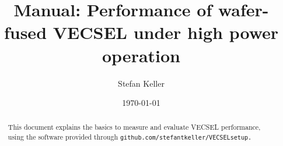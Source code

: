 \documentclass[11pt, a4paper, twoside]{article}
\title{Manual: Performance of wafer-fused VECSEL under high power operation}
\author{Stefan Keller}
\date{\today}
\newcommand{\code}[1]{\texttt{#1}}
\numberwithin{equation}{section} %
\numberwithin{table}{section}
\numberwithin{figure}{section}
\begin{document}
\maketitle
{}
\fancyhead[LO]{\leftmark}

\begin{abstract}
This document explains the basics
to measure and evaluate
VECSEL performance,
using the software provided
through \code{github.com/stefantkeller/VECSELsetup.}
\end{abstract}

\tableofcontents\newpage

\setcounter{section}{-1} %








\end{document}
